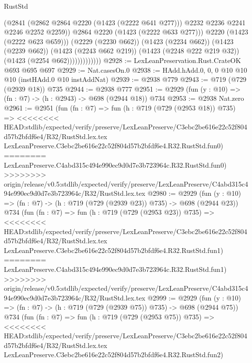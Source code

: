 \begin{lexlean}{RustStd}
\begin{coremodule}
{\begin{coremodule}
{{{{{{{{                                (@2841
                                  (@2862 @2864 @2220 (@1423 (@2222 @641 @277)))
                                  @2232
                                  @2236
                                  @2241
                                  @2246
                                  @2252
                                  @2259))
                              @2864
                              @2220
                              (@1423 (@2222 @633 @277)))
                            @2220
                            (@1423 (@2222 @623 @659)))
                          (@2229 (@2230 @662))
                          (@1423 (@2234 @662))
                          (@1423 (@2239 @662))
                          (@1423 (@2243 @662 @219))
                          (@1423 (@2248 @222 @219 @32))
                          (@1423 (@2254 @662)))))))))))))
@2928 := LexLeanPreservation.Rust.CrateOK @693 @695 @697
@2929 := Nat.casesOn.{0}
@2938 := HAdd.hAdd.{0, 0, 0} @10 @10 @10 (instHAdd.{0} @10 instAddNat)
@2939 := @2938 @779
@2943 := @719 (@729 (@2939 @18)) @735
@2944 := @2938 @777
@2951 := @2929 (fun (y : @10) => (fn : @7) -> (h : @2943) -> @698 (@2944 @18)) @734
@2953 := @2938 Nat.zero
@2961 := @2951
    (fun (fn : @7) =>
    fun (h : @719 (@729 (@2953 @18)) @735) =>
<<<<<<<< HEAD:stdlib/expected/verify/preserve/LexLeanPreserve/C3ebc2be616e22c52f804d57b2bfdf6e4/R32/RustStd.lex.tex
    LexLeanPreserve.C3ebc2be616e22c52f804d57b2bfdf6e4.R32.RustStd.fun0)
========
    LexLeanPreserve.C4abd315c494e990ec9d0d7e3b723964c.R32.RustStd.fun0)
>>>>>>>> origin/release/v0.5:stdlib/expected/verify/preserve/LexLeanPreserve/C4abd315c494e990ec9d0d7e3b723964c/R32/RustStd.lex.tex
@2980 := @2929
    (fun (y : @10) => (fn : @7) -> (h : @719 (@729 (@2939 @23)) @735) -> @698 (@2944 @23))
    @734
    (fun (fn : @7) =>
    fun (h : @719 (@729 (@2953 @23)) @735) =>
<<<<<<<< HEAD:stdlib/expected/verify/preserve/LexLeanPreserve/C3ebc2be616e22c52f804d57b2bfdf6e4/R32/RustStd.lex.tex
    LexLeanPreserve.C3ebc2be616e22c52f804d57b2bfdf6e4.R32.RustStd.fun1)
========
    LexLeanPreserve.C4abd315c494e990ec9d0d7e3b723964c.R32.RustStd.fun1)
>>>>>>>> origin/release/v0.5:stdlib/expected/verify/preserve/LexLeanPreserve/C4abd315c494e990ec9d0d7e3b723964c/R32/RustStd.lex.tex
@2999 := @2929
    (fun (y : @10) => (fn : @7) -> (h : @719 (@729 (@2939 @75)) @735) -> @698 (@2944 @75))
    @734
    (fun (fn : @7) =>
    fun (h : @719 (@729 (@2953 @75)) @735) =>
<<<<<<<< HEAD:stdlib/expected/verify/preserve/LexLeanPreserve/C3ebc2be616e22c52f804d57b2bfdf6e4/R32/RustStd.lex.tex
    LexLeanPreserve.C3ebc2be616e22c52f804d57b2bfdf6e4.R32.RustStd.fun2)
}}}}}}}}
\end{coremodule}}
\end{coremodule}
\end{lexlean}
